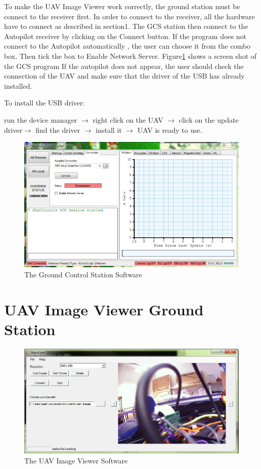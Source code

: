 \documentclass[a4paper,11pt]{article}
\begin{document}
To make the UAV Image Viewer work correctly, the ground station must be connect to the receiver first. 
In order to connect to the receiver, all the hardware have to connect as described in section1.
The GCS station then connect to the Autopilot receiver by clicking on the Connect button. If the program does not connect to the Autopilot automatically , the user can choose it from the combo box. Then tick the box to Enable Network Server. Figure\ref{GCS} shows a screen shot of the GCS program
If the autopilot does not appear, the user should check the connection of the UAV and make sure that the driver of the USB has already installed. 

To install the USB driver:

 run the device manager $\rightarrow$ right click on the UAV $\rightarrow$ click on the update driver$\rightarrow$ find the driver $\rightarrow$ install it $\rightarrow$ UAV is ready to use.

\begin{figure}[!htbp]
\begin{center}
\includegraphics[scale=0.5]{GCS.PNG}  
\caption{The Ground Control Station Software\label{GCS}}
\end{center}
\end{figure}
 


\section{UAV Image Viewer Ground Station}

\begin{figure}[!htbp]
\begin{center}
\includegraphics[scale=0.6]{windowApplication.PNG}  
\caption{The UAV Image Viewer Software\label{IVP}}
\end{center}
\end{figure}
\end{document}

